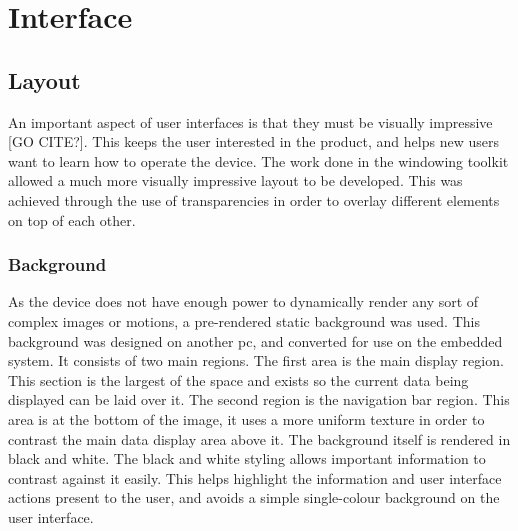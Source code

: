 
\chapter{Interface} %



\ifpdf
    \graphicspath{{6/figures/PNG/}{6/figures/PDF/}{6/figures/}}
\else
    \graphicspath{{6/figures/EPS/}{6/figures/}}
\fi



\section{Layout}

An important aspect of user interfaces is that they must be visually impressive [GO CITE?]. This keeps the user interested in the product, and helps new users want to learn how to operate the device. The work done in the windowing toolkit allowed a much more visually impressive layout to be developed. This was achieved through the use of transparencies in order to overlay different elements on top of each other.

\subsection{Background}

As the device does not have enough power to dynamically render any sort of complex images or motions, a pre-rendered static background was used. This background was designed on another pc, and converted for use on the embedded system. It consists of two main regions. The first area is the main display region. This section is the largest of the space and exists so the current data being displayed can be laid over it. The second region is the navigation bar region. This area is at the bottom of the image, it uses a more uniform texture in order to contrast the main data display area above it. The background itself is rendered in black and white. The black and white styling allows important information to contrast against it easily. This helps highlight the information and user interface actions present to the user, and avoids a simple single-colour background on the user interface.














